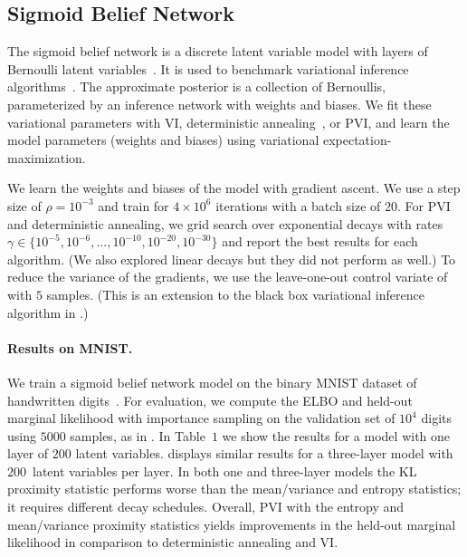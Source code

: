 \subsection{Sigmoid Belief Network}
The sigmoid belief network is a discrete latent variable model with layers of Bernoulli latent variables~\citep{neal1992connectionist,ranganath2015deep}. It is used to benchmark variational inference algorithms~\citep{Mnih:2016:VIM:3045390.3045621}. The approximate posterior is a collection of Bernoullis, parameterized by an inference network with weights and biases.  We fit these variational parameters with \gls{VI}, deterministic annealing~\citep{Katihara:2008}, or \gls{PVI}, and learn the model parameters (weights and biases) using variational expectation-maximization.


We learn the weights and biases of the model with gradient ascent. We use a step size of $\rho=10^{-3}$ and train for $4\times10^6$ iterations with a batch size of $20$.  For \gls{PVI}  and deterministic annealing, we grid search over exponential decays with rates $\gamma\in \{10^{-5}, 10^{-6}, ..., 10^{-10}, 10^{-20}, 10^{-30}\}$ and report the best results for each algorithm.  (We also explored linear decays but they did not perform as well.)  To reduce the variance of the gradients, we use the leave-one-out control variate of~\citet{Mnih:2016:VIM:3045390.3045621} with $5$ samples. (This is an extension to the black box variational inference algorithm in \citet{ranganath2014black}.)

\paragraph{Results on MNIST.} We train a sigmoid belief network model on the binary MNIST dataset of handwritten digits~\citep{pmlr-v15-larochelle11a}. For evaluation, we compute the \gls{ELBO} and held-out marginal likelihood with importance sampling on the validation set of $10^4$ digits using $5000$ samples, as in \citet{rezende2014stochastic}. In Table~$1$ we show the results for a model with one layer of $200$ latent variables.  displays similar results for a three-layer model with $200$~latent variables per layer. In both one and three-layer models the \gls{KL} proximity statistic performs worse than the mean/variance and entropy statistics; it requires different decay schedules. Overall, \gls{PVI} with the entropy and mean/variance proximity statistics yields improvements in the held-out marginal likelihood in comparison to deterministic annealing and \gls{VI}.

